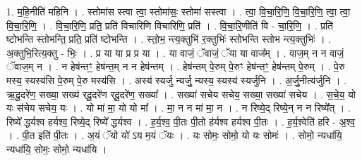 \documentclass[17pt]{extarticle}
\begin{document}
1. म॒हि॒नीति॑ महिनि । . स्तोमा॑स स्त्वा त्वा॒ स्तोमा॑सः॒ स्तोमा॑ सस्त्वा । . त्वा॒ वि॒चा॒रि॒णि॒ वि॒चा॒रि॒णि॒ त्वा॒ त्वा॒ वि॒चा॒रि॒णि॒ । . वि॒चा॒रि॒णि॒ प्रति॒ प्रति॑ विचारिणि विचारिणि॒ प्रति॑ । . वि॒चा॒रि॒णीति॑ वि - चा॒रि॒णि॒ । . प्रति॑ ष्टोभन्ति स्तोभन्ति॒ प्रति॒ प्रति॑ ष्टोभन्ति । . स्तो॒भ॒ न्त्य॒क्तुभि॑ र॒क्तुभिः॑ स्तोभन्ति स्तोभ न्त्य॒क्तुभिः॑ । . अ॒क्तुभि॒रित्य॒क्तु - भिः॒ । . प्र या या प्र प्र या । . या वाजं॒ ॅवाजं॒ ॅया या वाज᳚म् । . वाज॒म् न न वाजं॒ ॅवाज॒म् न । . न हेष॑न्तꣳ॒॒ हेष॑न्त॒म् न न हेष॑न्तम् । . हेष॑न्तम् पे॒रुम् पे॒रुꣳ हेष॑न्तꣳ॒॒ हेष॑न्तम् पे॒रुम् । . पे॒रु मस्य॒ स्यस्य॑सि पे॒रुम् पे॒रु मस्य॑सि । . अस्य॑ स्यर्जु न्यर्जु॒ न्यस्य॒ स्यस्य॑ स्यर्जुनि । . अ॒र्जु॒नीत्य॑र्जुनि । . ऋ॒दू॒दरे॑ण॒ सख्या॒ सख्य॑ र्‌दू॒दरे॑ण र्‌दू॒दरे॑ण॒ सख्या᳚ । . सख्या॑ सचेय सचेय॒ सख्या॒ सख्या॑ सचेय । . स॒चे॒य॒ यो यः स॑चेय सचेय॒ यः । . यो मा॑ मा॒ यो यो मा᳚ । . मा॒ न न मा॑ मा॒ न । . न रिष्ये॒द् रिष्ये॒न् न न रिष्ये᳚त् । . रिष्ये᳚ द्धर्यश्व हर्यश्व॒ रिष्ये॒द् रिष्ये᳚ द्धर्यश्व । . ह॒र्य॒श्व॒ पी॒तः पी॒तो ह॑र्यश्व हर्यश्व पी॒तः । . ह॒र्य॒श्वेति॑ हरि - अ॒श्व॒ । . पी॒त इति॑ पी॒तः । . अ॒यं ॅयो यो॑ ऽय म॒यं ॅयः । . यः सोमः॒ सोमो॒ यो यः सोमः॑ । . सोमो॒ न्यधा॑यि॒ न्यधा॑यि॒ सोमः॒ सोमो॒ न्यधा॑यि । \newline
\end{document}

